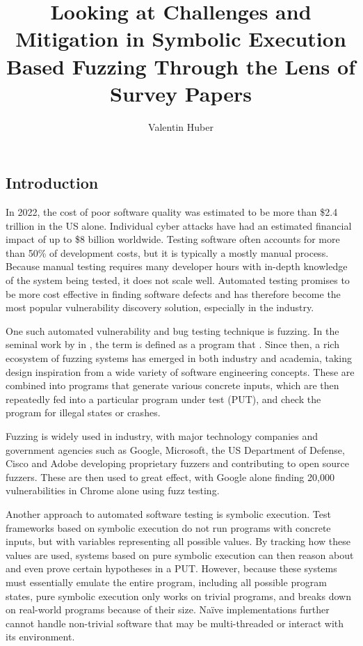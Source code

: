 \documentclass{article}
\title{Looking at Challenges and Mitigation in Symbolic Execution Based Fuzzing Through the Lens of Survey Papers}
\author{Valentin Huber}
\begin{document}


\maketitle
\begin{multicols}{2}
    \tableofcontents

    \section{Introduction}
    In 2022, the cost of poor software quality was estimated to be more than \$2.4 trillion in the US alone.\cite{CostPoorSoftware} Individual cyber attacks have had an estimated financial impact of up to \$8 billion worldwide.\cite{Demystifying} Testing software often accounts for more than 50\% of development costs\cite{Orchestrated}, but it is typically a mostly manual process\cite{PreliminaryAssessment}. Because manual testing requires many developer hours with in-depth knowledge of the system being tested, it does not scale well. Automated testing promises to be more cost effective in finding software defects and has therefore become the most popular vulnerability discovery solution, especially in the industry.\cite{FuzzingASurvey}

    One such automated vulnerability and bug testing technique is fuzzing.\cite{VulnerabilityDiscoveryTechniques} In the seminal work by \citeauthor{UNIX} in \citeyear{UNIX}, the term  is defined as a program that \cite{UNIX}. Since then, a rich ecosystem of fuzzing systems has emerged in both industry and academia, taking design inspiration from a wide variety of software engineering concepts. These are combined into programs that generate various concrete inputs, which are then repeatedly fed into a particular program under test (PUT), and check the program for illegal states or crashes.\cite{EvaluatingFuzzTesting}

    Fuzzing is widely used in industry, with major technology companies and government agencies such as Google, Microsoft, the US Department of Defense, Cisco and Adobe developing proprietary fuzzers and contributing to open source fuzzers. These are then used to great effect, with Google alone finding 20,000 vulnerabilities in Chrome alone using fuzz testing.\cite{Demystifying}

    Another approach to automated software testing is symbolic execution\cite{Symbex}. Test frameworks based on symbolic execution do not run programs with concrete inputs, but with variables representing all possible values. By tracking how these values are used, systems based on pure symbolic execution can then reason about and even prove certain hypotheses in a PUT. However, because these systems must essentially emulate the entire program, including all possible program states, pure symbolic execution only works on trivial programs, and breaks down on real-world programs because of their size. Naïve implementations further cannot handle non-trivial software that may be multi-threaded or interact with its environment.


\end{multicols}
\end{document}
